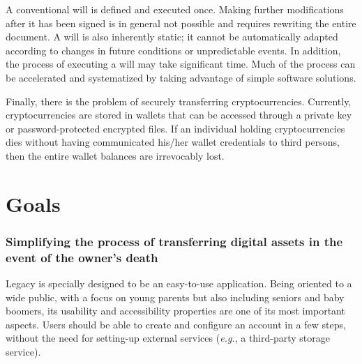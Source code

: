 A conventional will is defined and executed once. Making further modifications after it has been signed is in general not possible and requires rewriting the entire document. A will is also inherently static; it cannot be automatically adapted according to changes in future conditions or unpredictable events. In addition, the process of executing a will may take significant time. Much of the process can be accelerated and systematized by taking advantage of simple software solutions. 

Finally, there is the problem of securely transferring cryptocurrencies. Currently, cryptocurrencies are stored in wallets that can be accessed through a private key or password-protected encrypted files. If an individual holding cryptocurrencies dies without having communicated his/her wallet credentials to third persons, then the entire wallet balances are irrevocably lost. 


\section{Goals} %
\label{sec:goals}

\subsubsection*{Simplifying the process of transferring digital assets in the event of the owner's death} %
\label{ssub:simplifying_the_process_of_transferring_your_digital_possessions_after_your_death}
Legacy is specially designed to be an easy-to-use application. 
Being oriented to a wide public, with a focus on young parents but also including seniors and baby boomers, its usability and accessibility properties are one of its most important aspects.
Users should be able to create and configure an account in a few steps, without the need for setting-up external services (\textit{e.g.}, a third-party storage service). 

